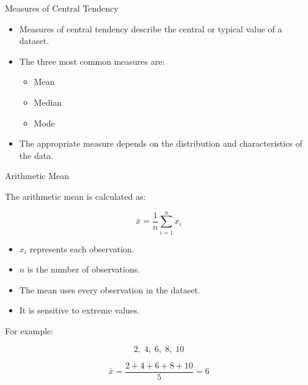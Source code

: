 \documentclass{beamer}
\begin{document}
\begin{frame}{Measures of Central Tendency}

\begin{itemize}

  \item Measures of central tendency describe the central or typical value of a dataset.

  \vskip 0.4cm

  \item The three most common measures are:

  \begin{itemize}
    \item Mean
    \item Median
    \item Mode
  \end{itemize}

  \vskip 0.4cm

  \item The appropriate measure depends on the distribution and characteristics of the data.

\end{itemize}

\end{frame}


\begin{frame}{Arithmetic Mean}

The arithmetic mean is calculated as:

\vskip 0.5cm

\[
\bar{x} =
\frac{1}{n}
\sum_{i=1}^{n} x_i
\]

\vskip 0.5cm

\begin{itemize}

  \item $x_i$ represents each observation.

  \item $n$ is the number of observations.

  \item The mean uses every observation in the dataset.

  \item It is sensitive to extreme values.

\end{itemize}

\vskip 0.3cm

For example:

\[
2,\;4,\;6,\;8,\;10
\]

\[
\bar{x} = \frac{2+4+6+8+10}{5}=6
\]

\end{frame}
\end{document}
